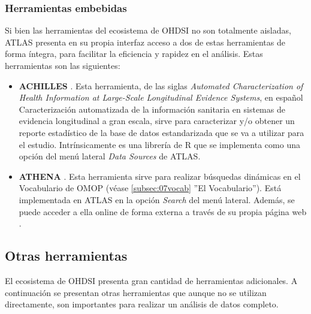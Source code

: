 \subsubsection{Herramientas embebidas}

Si bien las herramientas del ecosistema de OHDSI no son totalmente aisladas, ATLAS presenta en su propia interfaz acceso a dos de estas herramientas de forma íntegra, para facilitar la eficiencia y rapidez en el análisis. Estas herramientas son las siguientes:

\begin{itemize}

    \item \textbf{ACHILLES} \parencite{githubACHILLES}. Esta herramienta, de las siglas \textit{Automated Characterization of Health Information at Large-Scale Longitudinal Evidence Systems}, en español Caracterización automatizada de la información sanitaria en sistemas de evidencia longitudinal a gran escala, sirve para caracterizar y/o obtener un reporte estadístico de la base de datos estandarizada que se va a utilizar para el estudio. Intrínsicamente es una librería de R que se implementa como una opción del menú lateral \textit{Data Sources} de ATLAS.
    \item \textbf{ATHENA} \parencite{githubATHENA}. Esta herramienta sirve para realizar búsquedas dinámicas en el Vocabulario de OMOP (véase \ref{subsec:07vocab} ''El Vocabulario''). Está implementada en ATLAS en la opción \textit{Search} del menú lateral. Además, se puede acceder a ella online de forma externa a través de su propia página web \parencite{ATHENAweb}.
    
\end{itemize}


\subsection{Otras herramientas} \label{subsec:07otrasHerramientas}

El ecosistema de OHDSI presenta gran cantidad de herramientas adicionales. A continuación se presentan otras herramientas que aunque no se utilizan directamente, son importantes para realizar un análisis de datos completo. 

